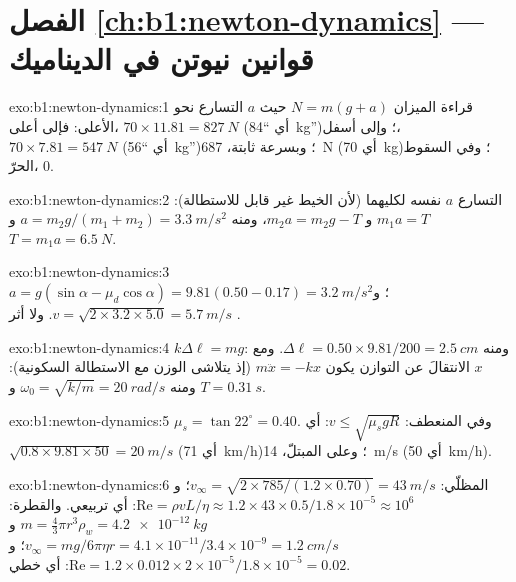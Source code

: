 \section*{الفصل \ref{ch:b1:newton-dynamics} --- قوانين نيوتن في الديناميك}

\begin{solution}{exo:b1:newton-dynamics:1}
قراءة الميزان $N = m(g + a)$ حيث $a$ التسارع نحو الأعلى: فإلى أعلى،
$70 \times 11.81 = \qty{827}{N}$ (أي ``\qty{84}{kg}'')؛ وإلى أسفل، $70 \times 7.81 =
\qty{547}{N}$ (أي ``\qty{56}{kg}'')؛ وبسرعة ثابتة، \qty{687}{N}
(أي \qty{70}{kg})؛ وفي السقوط الحرّ، $0$.
\end{solution}

\begin{solution}{exo:b1:newton-dynamics:2}
التسارع $a$ نفسه لكليهما (لأن الخيط غير قابل للاستطالة): $m_1a = T$ و
$m_2a = m_2g - T$، ومنه $a = m_2g/(m_1 + m_2) = \qty{3.3}{m/s^2}$ و
$T = m_1a = \qty{6.5}{N}$.
\end{solution}

\begin{solution}{exo:b1:newton-dynamics:3}
$a = g(\sin\alpha - \mu_d\cos\alpha) = 9.81(0.50 - 0.17) = \qty{3.2}{m/s^2}$؛
و$v = \sqrt{2 \times 3.2 \times 5.0} = \qty{5.7}{m/s}$. ولا أثر .
\end{solution}

\begin{solution}{exo:b1:newton-dynamics:4}
$k\Delta\ell = mg$: ومنه $\Delta\ell = 0.50 \times 9.81/200 = \qty{2.5}{cm}$.
ومع $x$ الانتقالَ عن التوازن يكون $m\ddot x = -kx$ (إذ يتلاشى الوزن
مع الاستطالة السكونية): ومنه $\omega_0 = \sqrt{k/m} = \qty{20}{rad/s}$ و
$T = \qty{0.31}{s}$.
\end{solution}

\begin{solution}{exo:b1:newton-dynamics:5}
$\mu_s = \tan 22^\circ = 0.40$. وفي المنعطف: $v \leq \sqrt{\mu_sgR}$: أي $\sqrt{0.8
\times 9.81 \times 50} = \qty{20}{m/s}$ (أي \qty{71}{km/h})؛ وعلى المبتلّ،
\qty{14}{m/s} (أي \qty{50}{km/h}).
\end{solution}

\begin{solution}{exo:b1:newton-dynamics:6}
المظلّي: $v_\infty = \sqrt{2 \times 785/(1.2 \times 0.70)} = \qty{43}{m/s}$؛
و$\mathrm{Re} = \rho vL/\eta \approx 1.2 \times 43 \times 0.5/1.8\times10^{-5}
\approx 10^6$: أي تربيعي. والقطرة: $m = \tfrac43\pi r^3\rho_w = \qty{4.2e-12}{kg}$ و
$v_\infty = mg/6\pi\eta r = 4.1\times10^{-11}/3.4\times10^{-9} = \qty{1.2}{cm/s}$؛
و$\mathrm{Re} = 1.2 \times 0.012 \times 2\times10^{-5}/1.8\times10^{-5} = 0.02$:
أي خطي.
\end{solution}

